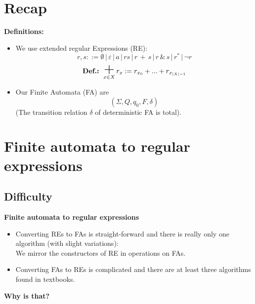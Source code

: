 \documentclass{beamer}
\DeclareMathOperator*{\bigplus}{\mbox{\huge +}}
\begin{document}
\section*{Recap}
\begin{frame}
    \textbf{Definitions:} \\

    \begin{itemize}
        \item 
            We use extended regular Expressions (RE):
            \[    
                r, s ::= \emptyset \, | \, \varepsilon \, | \,  a \, | \, rs \, | \,  r \,  + \, s \, | \, r \, \& \, s \, |\, r^* \, | \, \neg r
            \]
            \[
            \mbox{\textbf{Def.:} }  \bigplus_{x \in X} r_x := r_{x_0} + ... + r_{x_{|X|-1}}
            \]

        \item 
            Our Finite Automata (FA) are
            \[
                (\Sigma, Q, q_0, F, \delta)
            \]
            (The transition relation $\delta$ of deterministic FA is total).
    \end{itemize}
\end{frame}

\section*{Finite automata to regular expressions}
\subsection*{Difficulty}
\begin{frame}

    \large{\textbf{Finite automata to regular expressions}}

    \begin{itemize}
        \item
            Converting REs to FAs is straight-forward and there is really only one algorithm (with slight variations): \\
            We mirror the constructors of RE in operations on FAs.

            \pause

        \item
            Converting FAs to REs is complicated and there are at least three algorithms found in textbooks.
    \end{itemize}

    \pause

    {\centering 
        \textbf{Why is that?}

    }

\end{frame}
\end{document}
